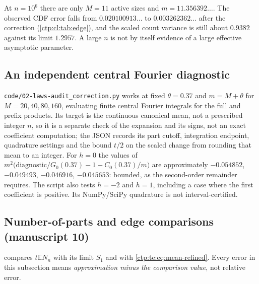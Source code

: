 \documentclass[11pt,a4paper]{article}
\numberwithin{equation}{section}
\theoremstyle{definition}
\theoremstyle{remark}
\newcommand{\E}{\mathbb E}
\begin{document}
\begin{table}[htbp]
\centering\small

\caption{Maximum CDF errors over the recorded thresholds $-28\le h\le9$
(manuscript~06). The leading approximation is $G_h$, the corrected one
$G_h+G_hC_h/m$; the last column multiplies the corrected maximum error by
$m^2$. Finite-range numerical maxima, not certified global error bounds.}
\label{ctp:cl:tab:edge}
\end{table}

At $n=10^6$ there are only $M=11$ active sizes and $m=11.356392\ldots$. The
observed CDF error falls from $0.020100913\ldots$ to $0.003262362\ldots$ after
the correction (\cref{ctp:cl:tab:edge}), and the scaled count variance is still about $0.9382$
against its limit $1.2957$. A large $n$ is not by itself evidence of a large
effective asymptotic parameter.

\begin{table}[htbp]
\centering\small

\caption{Total variation from exact coefficients and numerical products,
against the limiting curve (manuscript~06). For each $n$ the cutoffs are near
one quarter, one half and three quarters of $M$; the fractions vary because
$M$ is an integer.}
\label{ctp:cl:tab:tv}
\end{table}

\subsection{An independent central Fourier diagnostic}
\texttt{code/02-laws-audit\_correction.py} works at fixed $\theta=0.37$ and
$m=M+\theta$ for $M=20,40,80,160$, evaluating finite central Fourier integrals
for the full and prefix products. Its target is the continuous canonical
mean, not a prescribed integer $n$, so it is a separate check of the
expansion and its signs, not an exact coefficient computation; the JSON
records its part cutoff, integration endpoint, quadrature settings and the
bound $t/2$ on the scaled change from rounding that mean to an integer. For
$h=0$ the values of
$m^2\bigl(\text{diagnostic}/G_0(0.37)-1-C_0(0.37)/m\bigr)$ are approximately
$-0.054852$, $-0.049493$, $-0.046916$, $-0.045653$: bounded, as the
second-order remainder requires. The script also tests $h=-2$ and $h=1$,
including a case where the first coefficient is positive. Its NumPy/SciPy
quadrature is not interval-certified.

\subsection{Number-of-parts and edge comparisons (manuscript 10)}
 compares $t\E N_n$ with its limit $S_1$ and with
\eqref{ctp:te:eq:mean-refined}. Every error in this subsection means
\emph{approximation minus the comparison value}, not relative error.
\end{document}

